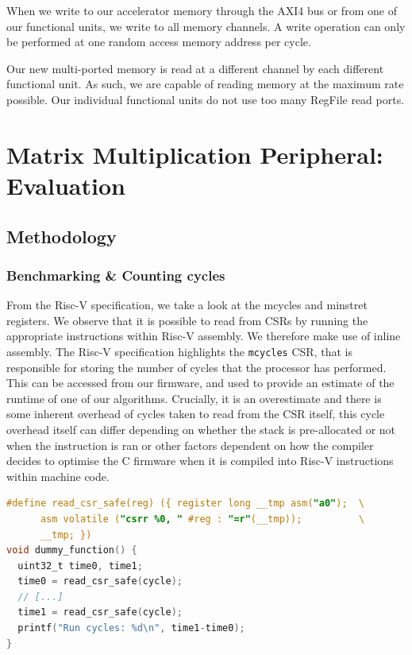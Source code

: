 \documentclass[a4paper,8pt]{report}
\begin{document}
When we write to our accelerator memory through the AXI4 bus or from one of our
functional units, we write to all memory channels. A write operation can only be
performed at one random access memory address per cycle.

Our new multi-ported memory is read at a different channel by each different
functional unit. As such, we are capable of reading memory at the maximum rate
possible. Our individual functional units do not use too many RegFile read ports.



\chapter{Matrix Multiplication Peripheral: Evaluation}
\section{Methodology}
\subsection{Benchmarking \& Counting cycles}
From the Risc-V specification, we take a look at the mcycles and minstret
registers. We observe that it is possible to read from CSRs by running the
appropriate instructions within Risc-V assembly. We therefore make use of inline
assembly. The Risc-V specification highlights the \texttt{mcycles} CSR, that is
responsible for storing the number of cycles that the processor has performed.
This can be accessed from our firmware, and used to provide an estimate of the
runtime of one of our algorithms. Crucially, it is an overestimate and there is
some inherent overhead of cycles taken to read from the CSR itself, this
cycle overhead itself can differ depending on whether the stack is pre-allocated
or not when the instruction is ran or other factors dependent on how the
compiler decides to optimise the C firmware when it is compiled into Risc-V
instructions within machine code.

\begin{lstlisting}[language=C,style=customc]
#define read_csr_safe(reg) ({ register long __tmp asm("a0");  \
      asm volatile ("csrr %0, " #reg : "=r"(__tmp));          \
      __tmp; })
void dummy_function() {
  uint32_t time0, time1;
  time0 = read_csr_safe(cycle);
  // [...]
  time1 = read_csr_safe(cycle);
  printf("Run cycles: %d\n", time1-time0);
}

\end{lstlisting}
\end{document}
